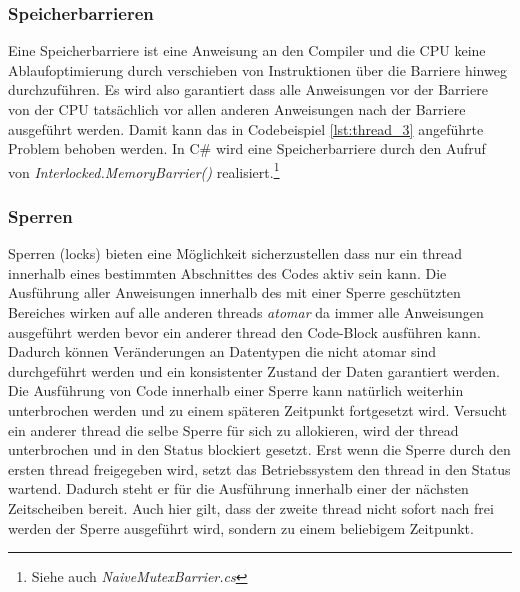 \subsubsection{Speicherbarrieren}
Eine Speicherbarriere ist eine Anweisung an den Compiler und die CPU keine Ablaufoptimierung durch verschieben von Instruktionen über die Barriere hinweg durchzuführen. Es wird also garantiert dass alle Anweisungen vor der Barriere von der CPU tatsächlich vor allen anderen Anweisungen nach der Barriere ausgeführt werden.\parencite[S. 195]{tanenbaum2016} Damit kann das in Codebeispiel \ref{lst:thread_3} angeführte Problem behoben werden. In C\# wird eine Speicherbarriere durch den Aufruf von \textit{Interlocked.MemoryBarrier()} realisiert.\parencite{ms_interlocked_barrier}\footnote{Siehe auch \textit{NaiveMutexBarrier.cs}}

\subsubsection{Sperren}\label{sss:Sperren}	
Sperren (locks) bieten eine Möglichkeit sicherzustellen dass nur ein thread innerhalb eines bestimmten Abschnittes des Codes aktiv sein kann. Die Ausführung aller Anweisungen innerhalb des mit einer Sperre geschützten Bereiches wirken auf alle anderen threads \textit{atomar} da immer alle Anweisungen ausgeführt werden bevor ein anderer thread den Code-Block ausführen kann. Dadurch können Veränderungen an Datentypen die nicht atomar sind durchgeführt werden und ein konsistenter Zustand der Daten garantiert werden. 
\\Die Ausführung von Code innerhalb einer Sperre kann natürlich weiterhin unterbrochen werden und zu einem späteren Zeitpunkt fortgesetzt wird. Versucht ein anderer thread die selbe Sperre für sich zu allokieren, wird der thread unterbrochen und in den Status blockiert gesetzt. Erst wenn die Sperre durch den ersten thread freigegeben wird, setzt das Betriebssystem den thread in den Status wartend. Dadurch steht er für die Ausführung innerhalb einer der nächsten Zeitscheiben bereit. Auch hier gilt, dass der zweite thread nicht sofort nach frei werden der Sperre ausgeführt wird, sondern zu einem beliebigem Zeitpunkt.

